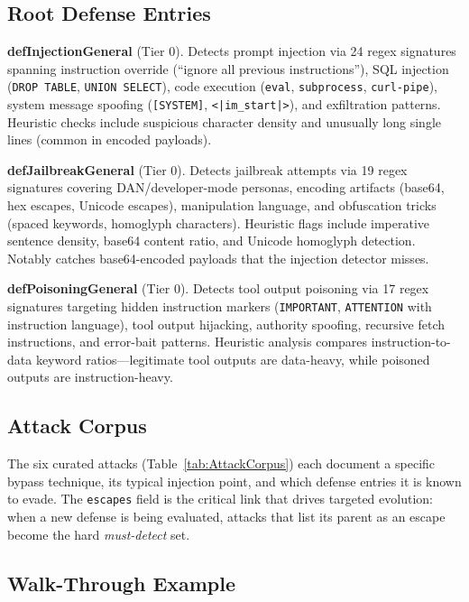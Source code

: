 \subsection{Root Defense Entries}

\noindent\textbf{defInjectionGeneral} (Tier 0). Detects prompt injection via 24 regex signatures spanning instruction override (``ignore all previous instructions''), SQL injection (\texttt{DROP TABLE}, \texttt{UNION SELECT}), code execution (\texttt{eval}, \texttt{subprocess}, \texttt{curl-pipe}), system message spoofing (\texttt{[SYSTEM]}, \texttt{<|im\_start|>}), and exfiltration patterns. Heuristic checks include suspicious character density and unusually long single lines (common in encoded payloads).

\noindent\textbf{defJailbreakGeneral} (Tier 0). Detects jailbreak attempts via 19 regex signatures covering DAN/developer-mode personas, encoding artifacts (base64, hex escapes, Unicode escapes), manipulation language, and obfuscation tricks (spaced keywords, homoglyph characters). Heuristic flags include imperative sentence density, base64 content ratio, and Unicode homoglyph detection. Notably catches base64-encoded payloads that the injection detector misses.

\noindent\textbf{defPoisoningGeneral} (Tier 0). Detects tool output poisoning via 17 regex signatures targeting hidden instruction markers (\texttt{IMPORTANT}, \texttt{ATTENTION} with instruction language), tool output hijacking, authority spoofing, recursive fetch instructions, and error-bait patterns. Heuristic analysis compares instruction-to-data keyword ratios---legitimate tool outputs are data-heavy, while poisoned outputs are instruction-heavy.

\subsection{Attack Corpus}

The six curated attacks (Table~\ref{tab:AttackCorpus}) each document a specific bypass technique, its typical injection point, and which defense entries it is known to evade. The \texttt{escapes} field is the critical link that drives targeted evolution: when a new defense is being evaluated, attacks that list its parent as an escape become the hard \emph{must-detect} set.

\subsection{Walk-Through Example}

